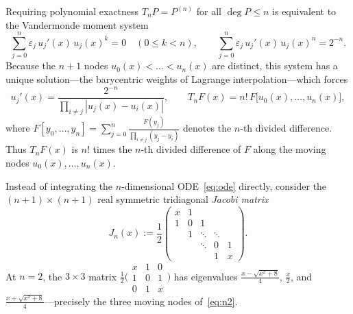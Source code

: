 \documentclass[11pt,a4paper]{article}
\theoremstyle{remark}
\numberwithin{equation}{section}
\begin{document}
Requiring polynomial exactness $T_n P = P^{(n)}$ for all $\deg P \le n$ is equivalent to the Vandermonde moment system
\[
    \sum_{j=0}^{n} \varepsilon_j\, u_j'(x)\, u_j(x)^k = 0 \quad (0 \le k < n),
    \qquad
    \sum_{j=0}^{n} \varepsilon_j\, u_j'(x)\, u_j(x)^n = 2^{-n}.
\]
Because the $n+1$ nodes $u_0(x) < \dots < u_n(x)$ are distinct, this system has a unique solution—the barycentric weights of Lagrange interpolation—which forces
\begin{equation}
    u_j'(x) = \frac{2^{-n}}{\prod_{i \neq j} |u_j(x) - u_i(x)|},
    \qquad
    T_n F(x) = n!\, F\bigl[u_0(x), \dots, u_n(x)\bigr],
    \label{eq:ode}
\end{equation}
where $F[y_0, \dots, y_n] = \sum_{j=0}^n \frac{F(y_j)}{\prod_{i \neq j}(y_j - y_i)}$ denotes the $n$-th divided difference. Thus $T_n F(x)$ is $n!$ times the $n$-th divided difference of $F$ along the moving nodes $u_0(x), \dots, u_n(x)$.

Instead of integrating the $n$-dimensional ODE~\eqref{eq:ode} directly, consider the $(n+1) \times (n+1)$ real symmetric tridiagonal \emph{Jacobi matrix}
\begin{equation}
    J_n(x) := \frac12
    \begin{pmatrix}
        x & 1 & & & \\
        1 & 0 & 1 & & \\
        & 1 & \ddots & \ddots & \\
        & & \ddots & 0 & 1 \\
        & & & 1 & x
    \end{pmatrix}.
    \label{eq:Jn}
\end{equation}
At $n = 2$, the $3 \times 3$ matrix $\frac12\bigl(\begin{smallmatrix} x & 1 & 0 \\ 1 & 0 & 1 \\ 0 & 1 & x \end{smallmatrix}\bigr)$ has eigenvalues $\frac{x - \sqrt{x^2+8}}{4}$, $\frac{x}{2}$, and $\frac{x + \sqrt{x^2+8}}{4}$—precisely the three moving nodes of~\eqref{eq:n2}.
\end{document}

